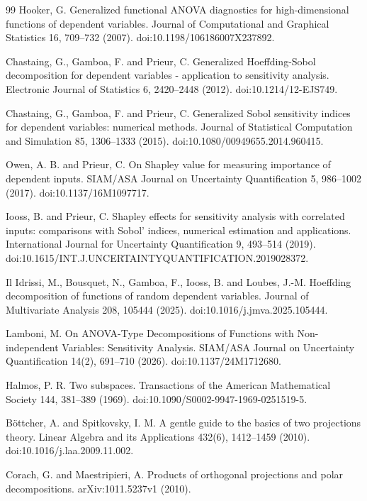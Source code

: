 \documentclass[11pt]{article}
\theoremstyle{remark}
\begin{document}
\begin{thebibliography}{99}
Hooker, G. Generalized functional ANOVA diagnostics for high-dimensional functions of dependent variables. Journal of Computational and Graphical Statistics 16, 709--732 (2007). doi:10.1198/106186007X237892.

Chastaing, G., Gamboa, F. and Prieur, C. Generalized Hoeffding-Sobol decomposition for dependent variables - application to sensitivity analysis. Electronic Journal of Statistics 6, 2420--2448 (2012). doi:10.1214/12-EJS749.

Chastaing, G., Gamboa, F. and Prieur, C. Generalized Sobol sensitivity indices for dependent variables: numerical methods. Journal of Statistical Computation and Simulation 85, 1306--1333 (2015). doi:10.1080/00949655.2014.960415.

Owen, A. B. and Prieur, C. On Shapley value for measuring importance of dependent inputs. SIAM/ASA Journal on Uncertainty Quantification 5, 986--1002 (2017). doi:10.1137/16M1097717.

Iooss, B. and Prieur, C. Shapley effects for sensitivity analysis with correlated inputs: comparisons with Sobol' indices, numerical estimation and applications. International Journal for Uncertainty Quantification 9, 493--514 (2019). doi:10.1615/INT.J.UNCERTAINTYQUANTIFICATION.2019028372.

Il Idrissi, M., Bousquet, N., Gamboa, F., Iooss, B. and Loubes, J.-M. Hoeffding decomposition of functions of random dependent variables. Journal of Multivariate Analysis 208, 105444 (2025). doi:10.1016/j.jmva.2025.105444.

Lamboni, M. On ANOVA-Type Decompositions of Functions with Non-independent Variables: Sensitivity Analysis. SIAM/ASA Journal on Uncertainty Quantification 14(2), 691--710 (2026). doi:10.1137/24M1712680.

Halmos, P. R. Two subspaces. Transactions of the American Mathematical Society 144, 381--389 (1969). doi:10.1090/S0002-9947-1969-0251519-5.

B\"ottcher, A. and Spitkovsky, I. M. A gentle guide to the basics of two projections theory. Linear Algebra and its Applications 432(6), 1412--1459 (2010). doi:10.1016/j.laa.2009.11.002.

Corach, G. and Maestripieri, A. Products of orthogonal projections and polar decompositions. arXiv:1011.5237v1 (2010).
\end{thebibliography}
\end{document}
